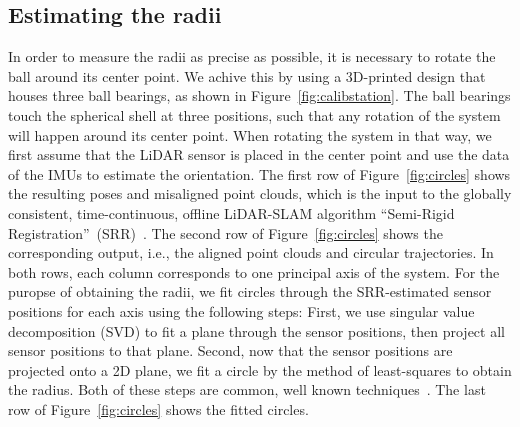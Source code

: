 \subsection{Estimating the radii}
In order to measure the radii as precise as possible, it is necessary to rotate the ball around its center point.
We achive this by using a 3D-printed design that houses three ball bearings, as shown in Figure~\ref{fig:calibstation}.
The ball bearings touch the spherical shell at three positions, such that any rotation of the system will happen around its center point.   
When rotating the system in that way, we first assume that the LiDAR sensor is placed in the center point and use the data of the IMUs to estimate the orientation.  
The first row of Figure~\ref{fig:circles} shows the resulting poses and misaligned point clouds, which is the input to the globally consistent, time-continuous, offline LiDAR-SLAM algorithm ``Semi-Rigid Registration''~(SRR)~\cite{srr}.
The second row of Figure~\ref{fig:circles} shows the corresponding output, i.e., the aligned point clouds and circular trajectories.
In both rows, each column corresponds to one principal axis of the system.
For the puropse of obtaining the radii, we fit circles through the SRR-estimated sensor positions for each axis using the following steps:
First, we use singular value decomposition (SVD) to fit a plane through the sensor positions, then project all sensor positions to that plane.
Second, now that the sensor positions are projected onto a 2D plane, we fit a circle by the method of least-squares to obtain the radius.
Both of these steps are common, well known techniques~\cite{geofit}.
The last row of Figure~\ref{fig:circles} shows the fitted circles.

